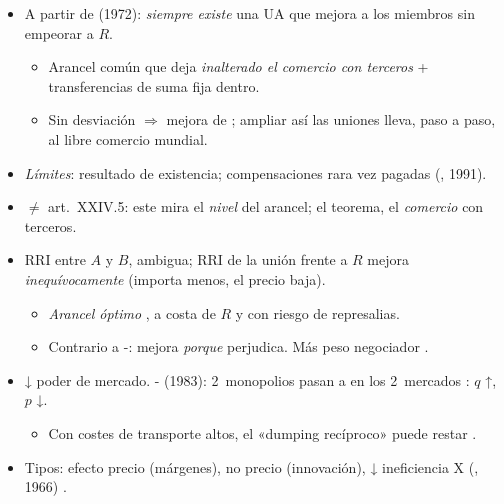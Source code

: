 \documentclass{article}
\begin{document}
\begin{columnas}
\begin{itemize}
\item A partir de  (1972): \emph{siempre existe} una UA que mejora a los miembros sin empeorar a $R$.
  \begin{itemize}
  \item Arancel común que deja \emph{inalterado el comercio con terceros} + transferencias de suma fija dentro.
  \item Sin desviación $\Rightarrow$ mejora de ; ampliar así las uniones lleva, paso a paso, al libre comercio mundial.
  \end{itemize}
\item \emph{Límites}: resultado de existencia; compensaciones rara vez pagadas (, 1991).
\item $\neq$ art.~XXIV.5: este mira el \emph{nivel} del arancel; el teorema, el \emph{comercio} con terceros.
\end{itemize}
\begin{itemize}
\item RRI entre $A$ y $B$, ambigua; RRI de la unión frente a $R$ mejora \emph{inequívocamente} (importa menos, el precio baja).
  \begin{itemize}
  \item \emph{Arancel óptimo} , a costa de $R$ y con riesgo de represalias.
  \item Contrario a -: mejora \emph{porque} perjudica. Más peso negociador .
  \end{itemize}
\end{itemize}
\begin{itemize}
\item ↓ poder de mercado. - (1983): 2~monopolios pasan a  en los 2~mercados : $q$ ↑, $p$ ↓.
  \begin{itemize}
  \item Con costes de transporte altos, el «dumping recíproco» puede restar .
  \end{itemize}
\item Tipos: efecto precio (márgenes), no precio (innovación), ↓ ineficiencia X (, 1966) .
\end{itemize}

\end{columnas}
\end{document}

